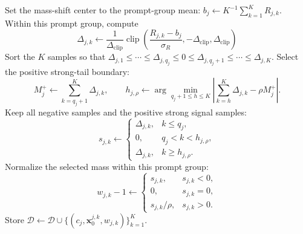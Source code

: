 \documentclass{article} %
\begin{document}
\begin{algorithm}[H]
\begin{algorithmic}[1]
                \State Set the mass-shift center to the prompt-group mean:
                $b_j\leftarrow K^{-1}\sum_{k=1}^{K}R_{j,k}$.
                \State Within this prompt group, compute
                \[
                    \Delta_{j,k}\leftarrow
                    \frac{1}{\Delta_{\mathrm{clip}}}
                    \operatorname{clip}\!\left(
                        \frac{R_{j,k}-b_j}{\sigma_R},
                        -\Delta_{\mathrm{clip}},
                        \Delta_{\mathrm{clip}}
                    \right)
                \]
                \State Sort the $K$ samples so that
                $\Delta_{j,1}\le\cdots\le\Delta_{j,q_j}\le0
                \le\Delta_{j,q_j+1}\le\cdots\le\Delta_{j,K}$.
                \State Select the positive strong-tail boundary:
                \[
                    M_j^+\leftarrow\sum_{k=q_j+1}^{K}\Delta_{j,k},
                    \qquad
                    h_{j,\rho}\leftarrow
                    \arg\min_{q_j+1\le h\le K}
                    \left|\sum_{k=h}^{K}\Delta_{j,k}-\rho M_j^+\right|.
                \]
                \State Keep all negative samples and the positive strong signal samples:
                \[
                    s_{j,k}\leftarrow
                    \begin{cases}
                        \Delta_{j,k},&k\le q_j,\\
                        0,&q_j<k<h_{j,\rho},\\
                        \Delta_{j,k},&k\ge h_{j,\rho}.
                    \end{cases}
                \]
                \State Normalize the selected mass within this prompt group:
                \[
                    w_{j,k}-1\leftarrow
                    \begin{cases}
                        s_{j,k},&s_{j,k}<0,\\
                        0,&s_{j,k}=0,\\
                        s_{j,k}/\rho,&s_{j,k}>0.
                    \end{cases}                    
                \]
                \State Store
                $\mathcal{D}\leftarrow\mathcal{D}\cup
                \{(c_j,\mathbf{x}_0^{j,k},w_{j,k})\}_{k=1}^{K}$.
            \EndFor


\end{algorithmic}
\end{algorithm}
\end{document}
